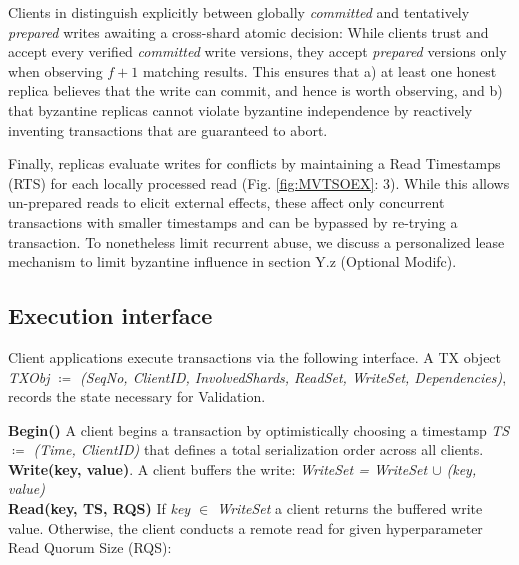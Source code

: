 Clients in \sys distinguish explicitly between globally \textit{committed} and tentatively \textit{prepared} writes awaiting a cross-shard atomic decision: While clients trust and accept every verified \textit{committed} write versions, they accept \textit{prepared} versions only when observing $f+1$ matching results. This ensures that a) at least one honest replica believes that the write can commit, and hence is worth observing, and b) that byzantine replicas cannot violate byzantine independence by reactively inventing transactions that are guaranteed to abort.

Finally, \sys replicas evaluate writes for conflicts by maintaining a Read Timestamps (RTS) for each locally processed read (Fig. \ref{fig:MVTSOEX}: 3). While this allows un-prepared reads to elicit external effects, these affect only concurrent transactions with smaller timestamps and can be bypassed by re-trying a transaction. To nonetheless limit recurrent abuse, we discuss a personalized lease mechanism to limit byzantine influence in section Y.z (Optional Modifc). 



\subsection{Execution interface}
Client applications execute transactions via the following interface. A TX object \textit{TXObj $\coloneqq$ (SeqNo, ClientID, InvolvedShards, ReadSet, WriteSet, Dependencies)}, records the state necessary for Validation.

\textbf{Begin()} A client begins a transaction by optimistically choosing a timestamp \textit{TS $\coloneqq$ (Time, ClientID)} that defines a total serialization order across all clients.  \\
\textbf{Write(key, value)}. A client buffers the write: \textit{WriteSet = WriteSet $\cup$ (key, value)}\\
\textbf{Read(key, TS, RQS)} 
If \textit{key $\in$ WriteSet} a client returns the buffered write value. Otherwise, the client conducts a remote read for given hyperparameter Read Quorum Size (RQS):


